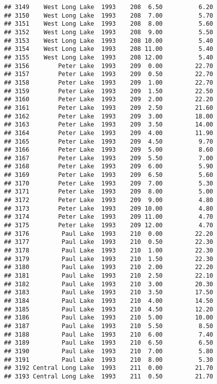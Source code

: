 \documentclass[
]{article}
\begin{document}
\begin{verbatim}
## 3149    West Long Lake  1993    208  6.50          6.20
## 3150    West Long Lake  1993    208  7.00          5.70
## 3151    West Long Lake  1993    208  8.00          5.60
## 3152    West Long Lake  1993    208  9.00          5.50
## 3153    West Long Lake  1993    208 10.00          5.40
## 3154    West Long Lake  1993    208 11.00          5.40
## 3155    West Long Lake  1993    208 12.00          5.40
## 3156        Peter Lake  1993    209  0.00         22.70
## 3157        Peter Lake  1993    209  0.50         22.70
## 3158        Peter Lake  1993    209  1.00         22.70
## 3159        Peter Lake  1993    209  1.50         22.50
## 3160        Peter Lake  1993    209  2.00         22.20
## 3161        Peter Lake  1993    209  2.50         21.60
## 3162        Peter Lake  1993    209  3.00         18.00
## 3163        Peter Lake  1993    209  3.50         14.00
## 3164        Peter Lake  1993    209  4.00         11.90
## 3165        Peter Lake  1993    209  4.50          9.70
## 3166        Peter Lake  1993    209  5.00          8.60
## 3167        Peter Lake  1993    209  5.50          7.00
## 3168        Peter Lake  1993    209  6.00          5.90
## 3169        Peter Lake  1993    209  6.50          5.60
## 3170        Peter Lake  1993    209  7.00          5.30
## 3171        Peter Lake  1993    209  8.00          5.00
## 3172        Peter Lake  1993    209  9.00          4.80
## 3173        Peter Lake  1993    209 10.00          4.80
## 3174        Peter Lake  1993    209 11.00          4.70
## 3175        Peter Lake  1993    209 12.00          4.70
## 3176         Paul Lake  1993    210  0.00         22.20
## 3177         Paul Lake  1993    210  0.50         22.30
## 3178         Paul Lake  1993    210  1.00         22.30
## 3179         Paul Lake  1993    210  1.50         22.30
## 3180         Paul Lake  1993    210  2.00         22.20
## 3181         Paul Lake  1993    210  2.50         22.10
## 3182         Paul Lake  1993    210  3.00         20.30
## 3183         Paul Lake  1993    210  3.50         17.50
## 3184         Paul Lake  1993    210  4.00         14.50
## 3185         Paul Lake  1993    210  4.50         12.20
## 3186         Paul Lake  1993    210  5.00         10.00
## 3187         Paul Lake  1993    210  5.50          8.50
## 3188         Paul Lake  1993    210  6.00          7.40
## 3189         Paul Lake  1993    210  6.50          6.50
## 3190         Paul Lake  1993    210  7.00          5.80
## 3191         Paul Lake  1993    210  8.00          5.30
## 3192 Central Long Lake  1993    211  0.00         21.70
## 3193 Central Long Lake  1993    211  0.50         21.70

\end{verbatim}
\end{document}
